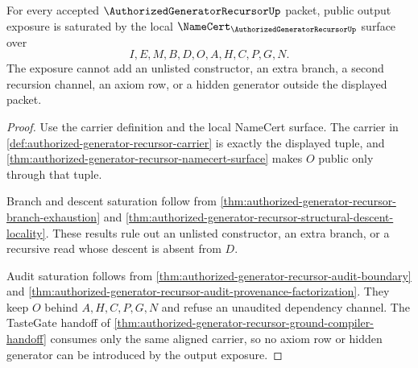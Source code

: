 \begin{theorem}
\label{thm:authorized-generator-recursor-root-output-namecert-saturation}
For every accepted $\AuthorizedGeneratorRecursorUp$ packet, public output
exposure is saturated by the local $\NameCert_{\AuthorizedGeneratorRecursorUp}$
surface over
$$
I,E,M,B,D,O,A,H,C,P,G,N.
$$
The exposure cannot add an unlisted constructor, an extra branch, a second
recursion channel, an axiom row, or a hidden generator outside the displayed
packet.
\end{theorem}
\begin{proof}
Use the carrier definition and the local NameCert surface. The carrier in
\autoref{def:authorized-generator-recursor-carrier} is exactly the displayed
tuple, and \autoref{thm:authorized-generator-recursor-namecert-surface} makes
$O$ public only through that tuple.

Branch and descent saturation follow from
\autoref{thm:authorized-generator-recursor-branch-exhaustion} and
\autoref{thm:authorized-generator-recursor-structural-descent-locality}. These
results rule out an unlisted constructor, an extra branch, or a recursive read
whose descent is absent from $D$.

Audit saturation follows from
\autoref{thm:authorized-generator-recursor-audit-boundary} and
\autoref{thm:authorized-generator-recursor-audit-provenance-factorization}.
They keep $O$ behind $A,H,C,P,G,N$ and refuse an unaudited dependency channel.
The TasteGate handoff of
\autoref{thm:authorized-generator-recursor-ground-compiler-handoff} consumes
only the same aligned carrier, so no axiom row or hidden generator can be
introduced by the output exposure.
\end{proof}

